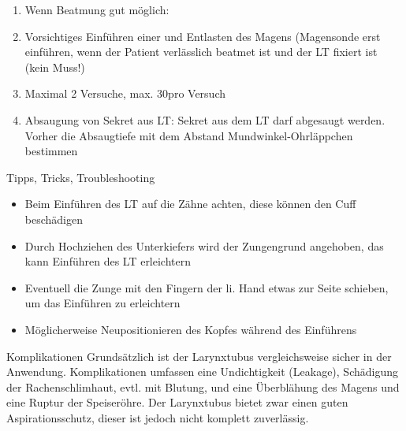 {\begin{WidePar}
\begin{multicols}{3}
\begin{enumerate}
\begin{enumerate}
    Achtung: Nicht seitengleiches Atemgeräusch beim
    Beatmen über den LT heißt: Verlegung eines Hauptbronchus
    (Fremdkörper) oder Pneumothorax, ist jedoch kein
    Hinweis für einen zu tief oder falsch liegenden Tubus
    (wie bei der Auskultation nach der endotrachealen
    Intubation))!
    \item Messung: sofortige 2-stellige et-Messung,
    Sp steigend oder gleichbleibend, Verfärbung des EasyCap
    II
  \end{enumerate}
  \item Wenn Beatmung gut möglich: 
  \item Vorsichtiges Einführen einer  und Entlasten des
  Magens (Magensonde erst einführen, wenn der Patient
  verlässlich beatmet ist und der LT fixiert ist (kein Muss!)
  \item Maximal 2 Versuche, max. 30\Sec* pro Versuch
  \item Absaugung von Sekret aus LT: Sekret aus dem LT  darf
  abgesaugt werden. Vorher die Absaugtiefe mit dem Abstand
  Mundwinkel-Ohrläppchen bestimmen
\end{enumerate}
\end{multicols}
\end{WidePar}




}
{}
{}
{}
{}

{Tipps, Tricks, Troubleshooting}
{
\begin{itemize}
  \item Beim Einführen des LT auf die Zähne achten, diese
  können den Cuff beschädigen
  \item Durch Hochziehen des Unterkiefers wird der
  Zungengrund angehoben, das kann Einführen des LT
  erleichtern
  \item Eventuell die Zunge mit den Fingern der li. Hand
  etwas zur Seite schieben, um das Einführen zu erleichtern
  \item Möglicherweise Neupositionieren des Kopfes während
  des Einführens
\end{itemize}


}
{}
{}
{}
{}

{Komplikationen}
{Grundsätzlich ist der Larynxtubus vergleichsweise sicher in
der Anwendung. Komplikationen umfassen eine Undichtigkeit
(Leakage), Schädigung der Rachenschlimhaut, evtl. mit
Blutung, und eine Überblähung des Magens und eine Ruptur
der Speiseröhre. Der Larynxtubus bietet zwar einen guten
Aspirationsschutz, dieser ist jedoch nicht komplett
zuverlässig.}
{}
{}
{}
{}

